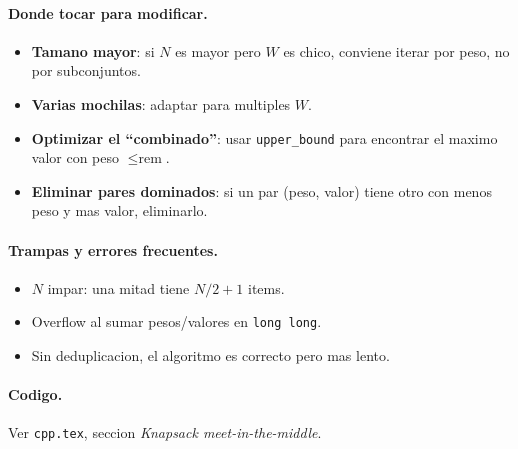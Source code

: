 \paragraph{Donde tocar para modificar.}
\begin{itemize}\setlength\itemsep{0pt}
	\item \textbf{Tamano mayor}: si $N$ es mayor pero $W$ es chico, conviene iterar por peso, no por subconjuntos.
	\item \textbf{Varias mochilas}: adaptar para multiples $W$.
	\item \textbf{Optimizar el ``combinado''}: usar \texttt{upper\_bound} para encontrar el maximo valor con peso $\le \text{rem}$.
	\item \textbf{Eliminar pares dominados}: si un par (peso, valor) tiene otro con menos peso y mas valor, eliminarlo.
\end{itemize}

\paragraph{Trampas y errores frecuentes.}
\begin{itemize}\setlength\itemsep{0pt}
	\item $N$ impar: una mitad tiene $N/2 + 1$ items.
	\item Overflow al sumar pesos/valores en \texttt{long long}.
	\item Sin deduplicacion, el algoritmo es correcto pero mas lento.
\end{itemize}

\paragraph{Codigo.}
Ver \texttt{cpp.tex}, seccion \textit{Knapsack meet-in-the-middle}.

\vspace{0.5em}
